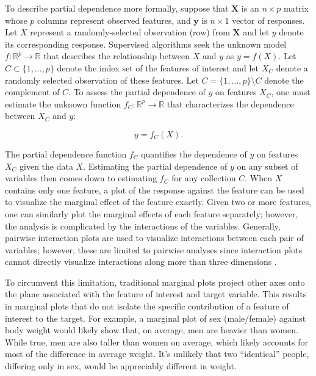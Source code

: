 \documentclass[12pt]{article}
\begin{document}
To describe partial dependence more formally, suppose that $\mathbf{X}$ is an $n \times p$ matrix whose $p$ columns represent observed features, and $\mathbf{y}$ is $n \times 1$ vector of responses. Let $X$ represent a randomly-selected observation (row) from $\mathbf{X}$ and let $y$ denote its corresponding response. Supervised algorithms seek the unknown model $f:\mathbb{R}^{p} \rightarrow \mathbb{R}$ that describes the relationship between $X$ and $y$ as ${y} = f({X}).$ Let $C \subset \{1, \ldots, p\}$ denote the index set of the features of interest and let $X_C$ denote a randomly selected observation of these features. Let $\overline{C} = \{1, \ldots, p\} \setminus C$ denote the complement of $C$. To assess the partial dependence of $y$ on features $X_C$, one must estimate the unknown function $f_C: \mathbb{R}^{p} \rightarrow \mathbb{R}$ that characterizes the dependence between $X_C$ and $y$:

\begin{equation}\label{problem}
	y = f_C(X).
\end{equation}

The partial dependence function $f_C$ quantifies the dependence of $y$ on features ${X}_C$ given the data $X$. Estimating the partial dependence of $y$ on any subset of variables then comes down to estimating $f_C$ for any collection $C$. When $X$ contains only one feature, a plot of the response against the feature can be used to visualize the marginal effect of the feature exactly. Given two or more features, one can similarly plot the marginal effects of each feature separately; however, the analysis is complicated by the interactions of the variables. Generally, pairwise interaction plots are used to visualize interactions between each pair of variables; however, these are limited to pairwise analyses since interaction plots cannot directly visualize interactions along more than three dimensions \citep{cox2014multivariate}.

To circumvent this limitation, traditional marginal plots project other axes onto the plane associated with the feature of interest and target variable. This results in marginal plots that do not isolate the specific contribution of a feature of interest to the target. For example, a marginal plot of sex (male/female) against body weight would likely show that, on average, men are heavier than women. While true, men are also taller than women on average, which likely accounts for most of the difference in average weight. It's unlikely that two ``identical'' people, differing only in sex, would be appreciably different in weight.  
\end{document}
